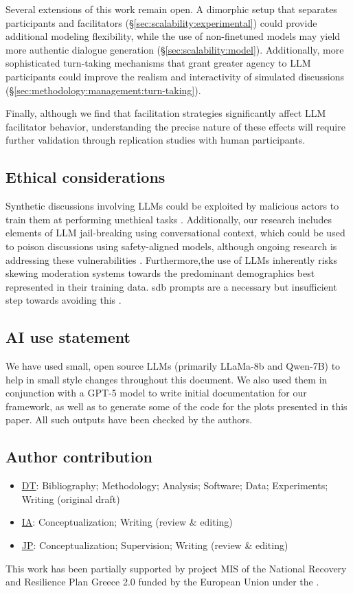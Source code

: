 Several extensions of this work remain open. A dimorphic setup that separates participants and facilitators (\S\ref{sec:scalability:experimental}) could provide additional modeling flexibility, while the use of non-finetuned models may yield more authentic dialogue generation (\S\ref{sec:scalability:model}). Additionally, more sophisticated turn-taking mechanisms that grant greater agency to LLM participants could improve the realism and interactivity of simulated discussions (\S\ref{sec:methodology:management:turn-taking}).

Finally, although we find that facilitation strategies significantly affect LLM facilitator behavior, understanding the precise nature of these effects will require further validation through replication studies with human participants.


\subsection{Ethical considerations}
Synthetic discussions involving LLMs could be exploited by malicious actors to train them at performing unethical tasks \cite{majumdar_2024_nefarious,MARULLI20245340,li_2025_vulnerable}. Additionally, our research includes elements of LLM jail-breaking using conversational context, which could be used to poison discussions using safety-aligned models, although ongoing research is addressing these vulnerabilities \cite{wang_2025_risk}. Furthermore,the use of LLMs inherently risks skewing moderation systems towards the predominant demographics best represented in their training data. \ac{sdb} prompts are a necessary but insufficient step towards avoiding this \cite{rossi_2024,anthis_2025,burton2024large}. 

\subsection{AI use statement}
We have used small, open source LLMs (primarily LLaMa-8b and Qwen-7B) to help in small style changes throughout this document. We also used them in conjunction with a GPT-5 model \cite{openai2024gpt4technicalreport} to write initial documentation for our framework, as well as to generate some of the code for the plots presented in this paper. All such outputs have been checked by the authors.

\subsection{Author contribution}
\begin{itemize}
	\item \href{mailto:dim.tsirmpas@aueb.gr}{DT}: Bibliography; Methodology; Analysis; Software; Data; Experiments; Writing (original draft)
	\item \href{mailto:ion@aueb.gr}{IA}: Conceptualization; Writing (review \& editing)
	\item  \href{mailto:annis@aueb.gr}{JP}: Conceptualization; Supervision; Writing (review \& editing)
\end{itemize}





\begin{acks}
	This work has been partially supported by project MIS  of the National Recovery and Resilience Plan Greece 2.0 funded by the European Union under the .	
\end{acks}
